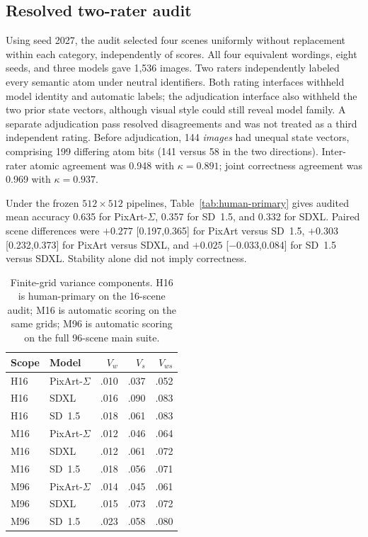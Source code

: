 \documentclass[10pt,letterpaper]{article}
\begin{document}
\subsection{Resolved two-rater audit}
Using seed 2027, the audit selected four scenes uniformly without replacement within each category, independently of scores. All four equivalent wordings, eight seeds, and three models gave 1,536 images. Two raters independently labeled every semantic atom under neutral identifiers. Both rating interfaces withheld model identity and automatic labels; the adjudication interface also withheld the two prior state vectors, although visual style could still reveal model family. A separate adjudication pass resolved disagreements and was not treated as a third independent rating. Before adjudication, 144 \emph{images} had unequal state vectors, comprising 199 differing atom bits (141 versus 58 in the two directions). Inter-rater atomic agreement was 0.948 with $\kappa=0.891$; joint correctness agreement was 0.969 with $\kappa=0.937$.

Under the frozen $512\times512$ pipelines, Table~\ref{tab:human-primary} gives audited mean accuracy 0.635 for PixArt-$\Sigma$, 0.357 for SD~1.5, and 0.332 for SDXL. Paired scene differences were $+0.277$ [0.197,0.365] for PixArt versus SD~1.5, $+0.303$ [0.232,0.373] for PixArt versus SDXL, and $+0.025$ [$-0.033$,0.084] for SD~1.5 versus SDXL. Stability alone did not imply correctness.

\begin{table}[t]
\centering\small
\caption{Finite-grid variance components. H16 is human-primary on the 16-scene audit; M16 is automatic scoring on the same grids; M96 is automatic scoring on the full 96-scene main suite.}
\label{tab:decomp}
\begin{tabular}{@{}llrrr@{}}\toprule
Scope & Model & $V_w$ & $V_s$ & $V_{ws}$\\\midrule
H16 & PixArt-$\Sigma$ & .010 & .037 & .052\\
H16 & SDXL & .016 & .090 & .083\\
H16 & SD~1.5 & .018 & .061 & .083\\
M16 & PixArt-$\Sigma$ & .012 & .046 & .064\\
M16 & SDXL & .012 & .061 & .072\\
M16 & SD~1.5 & .018 & .056 & .071\\
M96 & PixArt-$\Sigma$ & .014 & .045 & .061\\
M96 & SDXL & .015 & .073 & .072\\
M96 & SD~1.5 & .023 & .058 & .080\\\bottomrule
\end{tabular}
\end{table}
\end{document}
